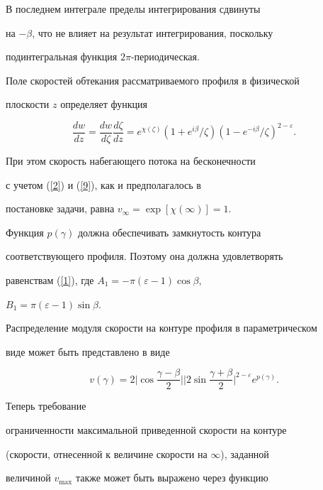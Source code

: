 В последнем интеграле пределы интегрирования сдвинуты


на $-\beta$, что не влияет на результат интегрирования, поскольку


подинтегральная функция $2\pi$-периодическая.





Поле скоростей обтекания рассматриваемого профиля в физической


плоскости $z$ определяет функция


$$


\frac{dw}{dz}=\frac{dw}{d\zeta}\frac{d\zeta}{dz}=


e^{\chi(\zeta)} (1 + e^{i\beta}/\zeta)(1 -


e^{-i\beta}/\zeta)^{2-\varepsilon}.


$$


При этом скорость набегающего потока на бесконечности


с учетом (\ref{2}) и (\ref{9}), как и предполагалось в


постановке задачи, равна $v_\infty =\exp[\chi(\infty)]=1.$


Функция $p(\gamma)$ должна обеспечивать замкнутость контура


соответствующего профиля. Поэтому она должна удовлетворять


равенствам (\ref{1}), где $A_1=-\pi(\varepsilon-1)\cos\beta$,


$B_1=\pi(\varepsilon-1)\sin\beta$.





Распределение модуля скорости на контуре профиля в параметрическом


виде может быть представлено в виде


\begin{equation}\label{13}


v(\gamma)=2\bigg|\cos\frac{\gamma-\beta}{2}\bigg|


\bigg|2\sin\frac{\gamma+\beta}{2}\bigg|^{2-\varepsilon}e^{p(\gamma)}.


\end{equation}


Теперь требование


ограниченности максимальной приведенной скорости на контуре


(скорости, отнесенной к величине скорости на $\infty$), заданной


величиной $v_{\max}$ также может быть выражено через функцию


